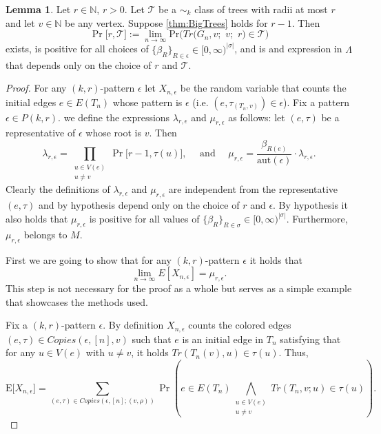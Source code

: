 \documentclass[12pt,notitlepage,a4paper]{article}
\theoremstyle{definition}
\newtheorem{lemma}{Lemma}[section]
\newcommand{\N}{\mathbb{N}}
\newcommand{\Ln}{\lim\limits_{n\to \infty}}
\newcommand{\PR}[1]{\mathrm{Pr}\big(#1\big)}
\newcommand{\aut}{\mathrm{aut}}
\begin{document}
	\begin{lemma} \label{lem:singletreeprob}
	Let $r\in \N$, $r>0$. Let $\mathcal{T}$ be a 
	$\sim_k$ class of trees with radii at most $r$ and 
	let $v\in \N$ be any vertex. 
	Suppose \cref{thm:BigTrees} holds
	for $r-1$. Then \[
	\Pr\big[r, \mathcal{T}\big]:=
	\Ln  \PR{Tr\big(G_n,v;\,\,v;\,\,r\big)\in \mathcal{T}}
	\] 
	exists, is positive for all choices of 
	$\{\beta_R\}_{R\in \epsilon}\in [0,\infty)^{|\sigma|}$,
	and is and expression in $\Lambda$ that depends
	only on the choice of $r$ and $\mathcal{T}$.   
	\end{lemma}
	\begin{proof}
		For any $(k,r)$-pattern  $\epsilon$  let 
		$X_{n,\epsilon}$ be the random variable that counts
		the initial edges $e\in E(T_n)$ whose pattern
		is $\epsilon$ (i.e. $(e,\tau_{(T_n,v)})\in \epsilon$). 
		Fix a pattern $\epsilon\in P(k,r)$.
		we define the expressions $\lambda_{r,\epsilon}$ and
		 $\mu_{r,\epsilon}$ 
		as follows: let $(e,\tau)$ be a representative of $\epsilon$
		whose root is $v$. Then
		\[
		\lambda_{r,\epsilon}=\prod_{\substack{u\in V(e)\\ u\neq v} } \Pr\big[
		r-1, \tau(u)\big], \quad \text{ and } \quad
		\mu_{r,\epsilon}=\frac{\beta_{R(e)}}{\aut(\epsilon)} 
		\cdot \lambda_{r,\epsilon}.
		\]
		Clearly the definitions of $\lambda_{r,\epsilon}$ and $\mu_{r,\epsilon}$
		are independent from the representative $(e,\tau)$ and by hypothesis
		depend only on the choice of $r$ and $\epsilon$. By hypothesis it also holds
		that $\mu_{r,\epsilon}$ is positive for all values of
		$\{ \beta_R \}_{R\in \sigma}\in [0,\infty)^{|\sigma|}$.
		 Furthermore, 
		$\mu_{r,\epsilon}$ belongs to $M$.\par
		First we are going to show that for any
		$(k,r)$-pattern $\epsilon$ it holds that
	 	\[
	 	\Ln E[X_{n,\epsilon}] = \mu_{r,\epsilon}.
	 	\]
	 	This step is not necessary for the proof as a whole but serves as a 
	 	simple example that showcases the methods used.		
		\par
		Fix a $(k,r)$-pattern $\epsilon$. 
		By definition $X_{n,\epsilon}$ counts
		the colored edges $(e,\tau)\in Copies(\epsilon,[n],v)$ 
		such that $e$ is an initial edge in $T_n$ satisfying that
		for any $u\in V(e)$ with $u\neq v$, it holds
		$Tr(T_n(v),u)\in \tau(u)$. Thus,
		\[
		\mathrm{E}\big[ X_{n,\epsilon} \big]
		= \sum_{(e,\tau)\in Copies(\epsilon,[n];(v,\rho))} \Pr
		\left(e\in E(T_n)
		\bigwedge_{\substack{u\in V(e)\\ u\neq v} } Tr(T_{n}, v; u)\in 
		\tau(u) \right).
\]
\end{proof}
\end{document}
